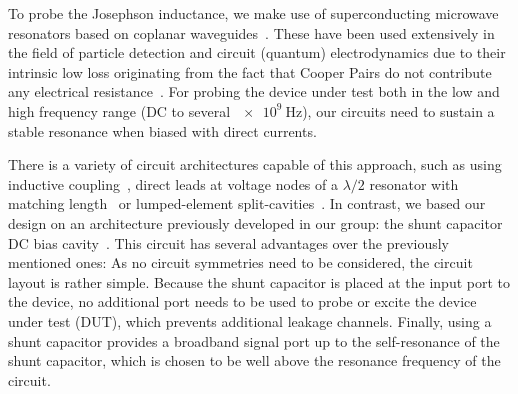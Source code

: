 To probe the Josephson inductance, we make use of superconducting microwave resonators based on coplanar waveguides~\cite{gopplCoplanarWaveguideResonators2008,zmuidzinasSuperconductingMicroresonatorsPhysics2012}.
%
These have been used extensively in the field of particle detection and circuit (quantum) electrodynamics due to their intrinsic low loss originating from the fact that Cooper Pairs do not contribute any electrical resistance~\cite{dayBroadbandSuperconductingDetector2003a,blaisCavityQuantumElectrodynamics2004c,clerkHybridQuantumSystems2020,blaisQuantumInformationProcessing2020}.
%
For probing the device under test both in the low and high frequency range (DC to several $\SI{e9}{\hertz}$), our circuits need to sustain a stable resonance when biased with direct currents.

There is a variety of circuit architectures capable of this approach, such as using inductive coupling~\cite{vissersFrequencytunableSuperconductingResonators2015b}, direct leads at voltage nodes of a $\lambda/2$ resonator with matching length~\cite{chenIntroductionDcBias2011a,liApplyingDirectCurrent2013} or lumped-element split-cavities~\cite{mahashabdeFastTunableHigh2020}.
%
In contrast, we based our design on an architecture previously developed in our group: the shunt capacitor DC bias cavity~\cite{bosmanBroadbandArchitectureGalvanically2015c}.
%
This circuit has several advantages over the previously mentioned ones:
%
As no circuit symmetries need to be considered, the circuit layout is rather simple.
%
Because the shunt capacitor is placed at the input port to the device, no additional port needs to be used to probe or excite the device under test (DUT), which prevents additional leakage channels.
%
Finally, using a shunt capacitor provides a broadband signal port up to the self-resonance of the shunt capacitor, which is chosen to be well above the resonance frequency of the circuit.

